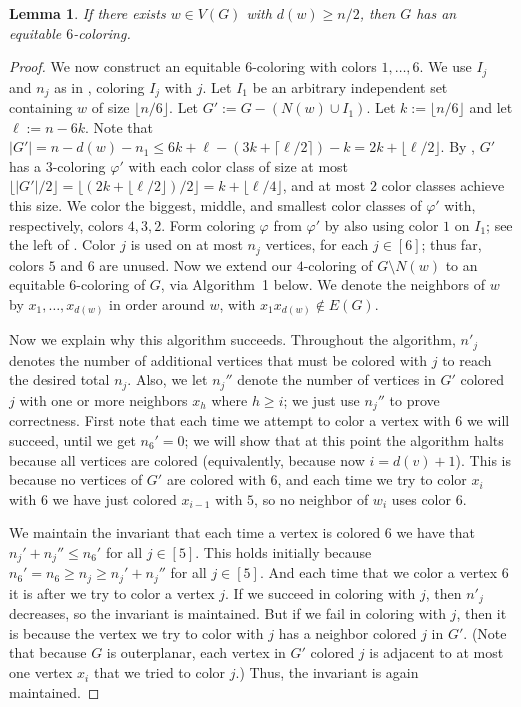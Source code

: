 \documentclass[11pt]{article}
\newtheorem{lem}{Lemma}
\theoremstyle{definition}
\newcommand\floor[1]{\lfloor#1\rfloor}
\newcommand\ceil[1]{\lceil#1\rceil}
\renewcommand\ge\geqslant
\renewcommand\le\leqslant
\newcommand\vph\varphi
\begin{document}
\begin{lem}
	If there exists $w\in V(G)$ with $d(w)\ge n/2$, 
	then $G$ has an equitable $6$-coloring.
	\label{alg1-lem1}
\end{lem}
\begin{proof}
	We now construct an equitable $6$-coloring with colors $1,\ldots,6$.  We use $I_j$ and $n_j$ as in , coloring $I_j$ with $j$.
	Let $I_1$ be an arbitrary independent set containing $w$ of size $\floor{n/6}$.  
	Let $G':=G-(N(w)\cup I_1)$.  Let $k:=\floor{n/6}$ and let $\ell:=n-6k$.
	Note that $|G'| = n-d(w)-n_1\le 6k+\ell - (3k+\ceil{\ell/2})-k = 2k + \floor{\ell/2}$.  By , $G'$ has a $3$-coloring 
	$\vph'$ with each color class of size at most $\floor{|G'|/2} = \floor{(2k+\floor{\ell/2})/2} = k+\floor{\ell/4}$, and at most $2$ color classes
	achieve this size.  We color the biggest, middle, and smallest color classes of $\vph'$ with, respectively, colors $4,3,2$.
	Form coloring $\vph$ from $\vph'$ by also using color $1$ on $I_1$; see the left of . 
	Color $j$ is used on at most $n_j$ vertices, for each $j\in [6]$; thus far, colors $5$ and $6$ are unused.
	Now we extend our $4$-coloring of $G\setminus N(w)$ to an equitable $6$-coloring of $G$, via Algorithm~1 below.
	We denote the neighbors of $w$ by $x_1,\ldots,x_{d(w)}$ in order around $w$, with ${x_1x_{d(w)}}\notin E(G)$.

	Now we explain why this algorithm succeeds.  Throughout the algorithm, $n'_j$ denotes the number of additional vertices that must be colored with 
	$j$ to reach the desired total $n_j$.  Also, we let $n_j''$ denote the number of vertices in $G'$ colored $j$ with one or more neighbors $x_h$ 
	where $h\ge i$; we just use $n_j''$ to prove correctness.  First note that each time we attempt to color a vertex with $6$ we will succeed, 
	until we get 
	$n_6'=0$; we will show that at this point the algorithm halts because all vertices are colored (equivalently, because now $i=d(v)+1$).  This is 
	because no vertices of $G'$ are colored with $6$, and each time we try to color $x_i$ with $6$ we have just colored $x_{i-1}$ with $5$, so no 
	neighbor of $w_i$ uses color $6$.

	We maintain the invariant that each time a vertex is colored $6$ we have that $n_j'+n_j''\le n_6'$ for all $j\in[5]$.  This holds initially 
	because $n_6'=n_6\ge n_j\ge n_j'+n_j''$ for all $j\in[5]$.  And each time that we color a vertex $6$ it is after we try to color a vertex $j$.  
	If we succeed in coloring with $j$, then $n'_j$ decreases, so the invariant is maintained.  But if we fail in coloring with $j$, then it is 
	because the vertex we try to color with $j$ has a neighbor colored $j$ in $G'$.  (Note that because $G$ is outerplanar, each vertex in $G'$ 
	colored $j$ is adjacent to at most one vertex $x_i$ that we tried to color $j$.)  Thus, the invariant is again maintained.


\end{proof}
\end{document}
